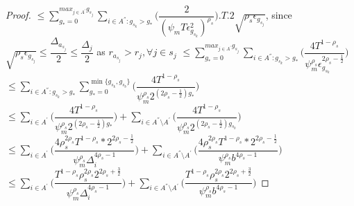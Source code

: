 \begin{proof}
\newline
\hspace*{0em}$\leq\sum_{g_{*}=0}^{max_{j\in A^{'}}g_{s_{j}}}\sum_{i\in A^{''}:g_{s_{k}}>g_{*}}\bigg(\dfrac{2}{(\psi_{m}T\epsilon_{g_{s_{k}}}^{2})^{\rho_{s}}} \bigg).T.2\sqrt{\rho_{s}\epsilon_{g_{s_{j}}}}$, since $\sqrt{\rho_{s}\epsilon_{g_{s_{j}}}}\leq\dfrac{\Delta_{a_{s_{j}}}}{2}\leq  \dfrac{\Delta_{j}}{2}$ as ${r}_{a_{s_{j}}}>{r}_{j},\forall j\in s_{j}$
\newline
\hspace*{0em}$\leq\sum_{g_{*}=0}^{max_{j\in A^{'}}g_{s_{j}}}\sum_{i\in A^{''}:g_{s_{k}}>g_{*}}\bigg(\dfrac{4T^{1-\rho_{s}}}{\psi_{m}^{\rho_{s}}\epsilon_{g_{s_{k}}}^{2\rho_{s} - \frac{1}{2}}} \bigg) $
\newline
\hspace*{0em}$\leq\sum_{i\in A^{''}:g_{s_{k}}>g_{*}}\sum_{g_{*}=0}^{\min{\lbrace g_{s_{k}},g_{s_{b}}\rbrace}}\bigg(\dfrac{4T^{1-\rho_{s}}}{\psi_{m}^{\rho_{s}}2^{({2\rho_{s} - \frac{1}{2}})g_{*}}} \bigg) $
\newline
\hspace*{0em}$\leq\sum_{i\in A^{'}}\bigg(\dfrac{4T^{1-\rho_{s}}}{\psi_{m}^{\rho_{s}}2^{({2\rho_{s} - \frac{1}{2}})g_{*}}} \bigg)+\sum_{i\in A^{''}\setminus A^{'}}\bigg(\dfrac{4T^{1-\rho_{s}}}{\psi_{m}^{\rho_{s}}2^{({2\rho_{s} - \frac{1}{2}})g_{s_{b}}}} \bigg)$
\newline
\hspace*{0em}$\leq\sum_{i\in A^{'}}\bigg(\dfrac{4\rho_{s}^{2\rho_{s}}T^{1-\rho_{s}}*2^{2\rho_{s}-\frac{1}{2}}}{\psi_{m}^{\rho_{s}}\Delta_{i}^{4\rho_{s}-1}} \bigg)+\sum_{i\in A^{''}\setminus A^{'}}\bigg(\dfrac{4\rho_{s}^{2\rho_{s}}T^{1-\rho_{s}}*2^{2\rho_{s}-\frac{1}{2}}}{\psi_{m}^{\rho_{s}}b^{4\rho_{s}-1}} \bigg)$
\newline
\hspace*{0em}$\leq\sum_{i\in A^{'}}\bigg(\dfrac{T^{1-\rho_{s}}\rho_{s}^{2\rho_{s}}2^{2\rho_{s}+\frac{3}{2}}}{\psi_{m}^{\rho_{s}}\Delta_{i}^{4\rho_{s}-1}} \bigg)+\sum_{i\in A^{''}\setminus A^{'}}\bigg(\dfrac{T^{1-\rho_{s}}\rho_{s}^{2\rho_{s}}2^{2\rho_{s}+\frac{3}{2}}}{\psi_{m}^{\rho_{s}}b^{4\rho_{s}-1}} \bigg)$


\end{proof}
